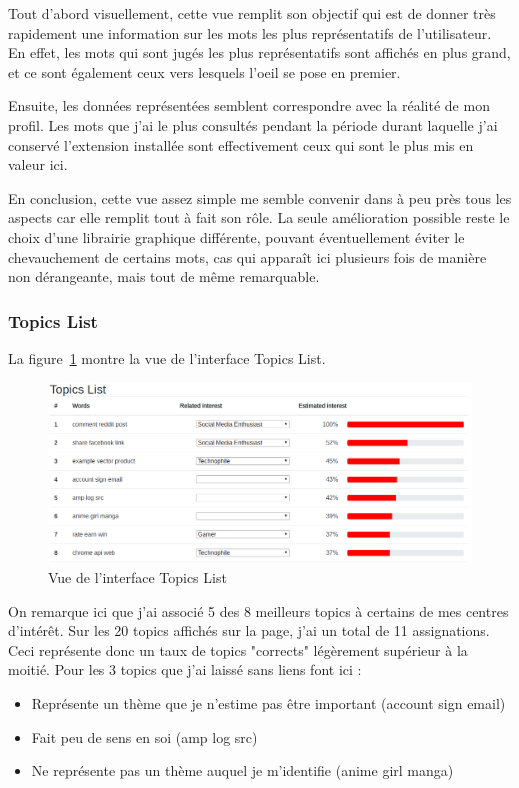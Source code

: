 		Tout d'abord visuellement, cette vue remplit son objectif qui est de donner très rapidement une information sur les mots les plus représentatifs de l'utilisateur. En effet, les mots qui sont jugés les plus représentatifs sont affichés en plus grand, et ce sont également ceux vers lesquels l'oeil se pose en premier.

		Ensuite, les données représentées semblent correspondre avec la réalité de mon profil. Les mots que j'ai le plus consultés pendant la période durant laquelle j'ai conservé l'extension installée sont effectivement ceux qui sont le plus mis en valeur ici.

		En conclusion, cette vue assez simple me semble convenir dans à peu près tous les aspects car elle remplit tout à fait son rôle. La seule amélioration possible reste le choix d'une librairie graphique différente, pouvant éventuellement éviter le chevauchement de certains mots, cas qui apparaît ici plusieurs fois de manière non dérangeante, mais tout de même remarquable.

\FloatBarrier

		\subsubsection{Topics List}

		La figure~\ref{critique-topics} montre la vue de l'interface Topics List.

		\begin{figure}[!h]
			\centering
			\includegraphics[width=1\textwidth]{images/results/critique-topics}
			\caption{Vue de l'interface Topics List}
			\label{critique-topics}
		\end{figure}

		On remarque ici que j'ai associé 5 des 8 meilleurs topics à certains de mes centres d'intérêt. Sur les 20 topics affichés sur la page, j'ai un total de 11 assignations. Ceci représente donc un taux de topics "corrects" légèrement supérieur à la moitié. Pour les 3 topics que j'ai laissé sans liens font ici :
		\begin{itemize}
			\item Représente un thème que je n'estime pas être important (account sign email)
			\item Fait peu de sens en soi (amp log src)
			\item Ne représente pas un thème auquel je m'identifie (anime girl manga)
		\end{itemize}

